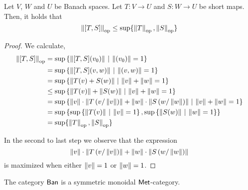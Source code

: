 \begin{lemma} \label{lem_op_max_trace}
  Let $V$, $W$ and $U$ be Banach spaces. Let $ T: V \to U$ and $ S: W \to U$ be short maps. Then, it holds that 
  $$ \left\lVert [T, S] \right\rVert_{\text{op}} \leq \sup \{\left\lVert T \right\rVert_{\text{op}},\left\lVert S \right\rVert_{\text{op}}\}$$
\end{lemma}


\begin{proof}
We calculate,
\begin{align*} 
   \left\lVert [T, S] \right\rVert_{\text{op}} &  = \sup{\{ \left\lVert [T, S] (v_0) \right\rVert   \hspace{2pt} |  \hspace{2pt}  \left\lVert (v_0) \right\rVert = 1  \}}\\
   & = \sup{\{ \left\lVert [T, S] (v, w) \right\rVert   \hspace{2pt} |  \hspace{2pt}  \left\lVert (v, w ) \right\rVert = 1  \}}  \\
   & = \sup \left\{  \left\lVert T (v) + S (w) \right\rVert  \, \vert \, \left\lVert v \right\rVert + \left\lVert w \right\rVert= 1 \right\} \\
   & \leq \sup \left\{  \left\lVert T (v) \right\rVert + \left\lVert S (w) \right\rVert  \, \vert \, \left\lVert v \right\rVert + \left\lVert w \right\rVert= 1 \right\} \\
   & = \sup \left\{ \left\lVert v \right\rVert \cdot   \left\lVert T \left( v / \left\lVert v  \right\rVert\right)  \right\rVert + \left\lVert w \right\rVert \cdot \left\lVert S \left( w / \left\lVert w \right\rVert\right) \right\rVert \, \vert \, \left\lVert v \right\rVert + \left\lVert w \right\rVert= 1  \right\}  \\
   & = \sup  \left\{ \sup \left\{\left\lVert T(v) \right\rVert   \hspace{2pt} |  \hspace{2pt}  \left\lVert v \right\rVert = 1  \right\},\sup \left\{\left\lVert S(w) \right\rVert   \hspace{2pt} |  \hspace{2pt}  \left\lVert w \right\rVert = 1   \right\}  \right\} \\
   & = \sup \{\left\lVert T \right\rVert_{\text{op}},\left\lVert S \right\rVert_{\text{op}}\}
\end{align*}

In the second to last step we observe that the expression 
\[\left\lVert v \right\rVert \cdot   \left\lVert T \left( v / \left\lVert v  \right\rVert\right)  \right\rVert + \left\lVert w \right\rVert \cdot \left\lVert S \left( w / \left\lVert w \right\rVert\right) \right\rVert \]
is maximized when either $\left\lVert v \right\rVert=1$ or $\left\lVert w \right\rVert=1$.
 
\end{proof}


\begin{theorem} \cite[Theorem 4.3]{dahlqvist2023syntactic} \label{thm:ban_monoidal_met}
      The category $\mathsf{Ban}$ is a  symmetric monoidal $\mathsf{Met}$-category.
  \end{theorem}

